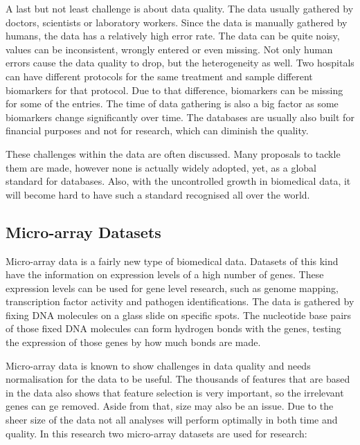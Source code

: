 \documentclass[10pt,a4paper]{report}
\begin{document}
	A last but not least challenge is about data quality. The data usually gathered by doctors, scientists or laboratory workers. Since the data is manually gathered by humans, the data has a relatively high error rate. The data can be quite noisy, values can be inconsistent, wrongly entered or even missing\cite{CIOS20021}. Not only human errors cause the data quality to drop, but the heterogeneity as well. Two hospitals can have different protocols for the same treatment and sample different biomarkers for that protocol. Due to that difference, biomarkers can be missing for some of the entries. The time of data gathering is also a big factor as some biomarkers change significantly over time. The databases are usually also built for financial purposes and not for research, which can diminish the quality\cite{Yoo2012}.
	
	These challenges within the data are often discussed\cite{bellazzi2011data}. Many proposals to tackle them are made, however none is actually widely adopted, yet, as a global standard for databases. Also, with the uncontrolled growth in biomedical data, it will become hard to have such a standard recognised all over the world\cite{Otasek2014, marenco2004qis, bichutskiy2006heterogeneous, sperzel1991biomedical, aubry1988design, Windridge2014}.
	
	\subsection{Micro-array Datasets}
	\label{PLsubsec:Microarray}
	
	Micro-array data is a fairly new type of biomedical data. Datasets of this kind have the information on expression levels of a high number of genes\cite{brazma2001minimum}. These expression levels can be used for gene level research, such as genome mapping, transcription factor activity and pathogen identifications. The data is gathered by fixing DNA molecules on a glass slide on specific spots. The nucleotide base pairs of those fixed DNA molecules can form hydrogen bonds with the genes, testing the expression of those genes by how much bonds are made\cite{selvaraj2011microarray}.
	
	Micro-array data is known to show challenges in data quality and needs normalisation for the data to be useful\cite{selvaraj2011microarray}. The thousands of features that are based in the data also shows that feature selection is very important, so the irrelevant genes can ge removed. Aside from that, size may also be an issue. Due to the sheer size of the data not all analyses will perform optimally in both time and quality. In this research two micro-array datasets are used for research:
	
\end{document}
